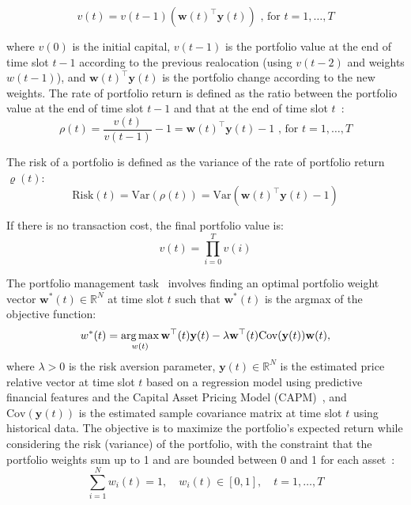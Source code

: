 \documentclass[../xlapes02]{subfiles}
\begin{document}
    \begin{equation}
        v(t)=v(t-1)(\mathbf{w}(t)^\top\mathbf{y}(t))\text{ , for }t=1,\ldots,T
    \end{equation}

    where $v(0)$ is the initial capital, $v(t-1)$ is the portfolio value at the end of time slot $t-1$ according to the previous realocation (using $v(t-2)$ and weights $w(t-1)$), and $\mathbf{w}(t)^\top\mathbf{y}(t)$ is the portfolio change according to the new weights. The rate of portfolio return is defined as the ratio between the portfolio value at the end of time slot $t-1$ and that at the end of time slot $t$~\cite{finrl-portfolio-allocation-2020}:
    \begin{equation}
        \rho(t)=\frac{v(t)}{v(t-1)}-1=\mathbf{w}(t)^\top\mathbf{y}(t)-1\text{ , for }t=1,\ldots,T
    \end{equation}

    The risk of a portfolio is defined as the variance of the rate of portfolio return $\varrho(t)$:
    \begin{equation}
        \text{Risk}(t)=\text{Var}(\rho(t))=\text{Var}(\mathbf{w}(t)^\top \mathbf{y}(t) - 1)
    \end{equation}

    If there is no transaction cost, the final portfolio value is:
    \begin{equation}
        \label{eq:portfolio-value}
        v(t) = \prod_{i=0}^{T} v(i)
    \end{equation}

    The portfolio management task~\cite{enwiki:1043516653} involves finding an optimal portfolio weight vector $\mathbf{w}^*(t) \in \mathbb{R}^N$ at time slot $t$ such that $\mathbf{w}^*(t)$ is the argmax of the objective function:
    \begin{equation}
        w^*(t)=\operatorname*{arg\,max}_{w(t)}\mathbf{w}^\top(t)\mathbf{y}(t)-\lambda\mathbf{w}^\top(t)\text{Cov}(\mathbf{y}(t))\mathbf{w}(t),
    \end{equation}
    where $\lambda > 0$ is the risk aversion parameter, $\mathbf{y}(t) \in \mathbb{R}^N$ is the estimated price relative vector at time slot $t$ based on a regression model using predictive financial features and the Capital Asset Pricing Model (CAPM)~\cite{fama-2004}, and $\text{Cov}(\mathbf{y}(t))$ is the estimated sample covariance matrix at time slot $t$ using historical data. The objective is to maximize the portfolio's expected return while considering the risk (variance) of the portfolio, with the constraint that the portfolio weights sum up to 1 and are bounded between 0 and 1 for each asset~\cite{finrl-portfolio-allocation-2020}:
    \begin{equation}
        \sum_{i=1}^{N}w_i(t)=1,\quad w_i(t)\in[0,1],\quad t=1,\ldots,T
    \end{equation}
\end{document}
